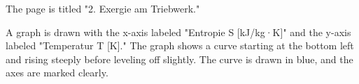 The page is titled "2. Exergie am Triebwerk."  

A graph is drawn with the x-axis labeled "Entropie S [kJ/kg·K]" and the y-axis labeled "Temperatur T [K]." The graph shows a curve starting at the bottom left and rising steeply before leveling off slightly. The curve is drawn in blue, and the axes are marked clearly.